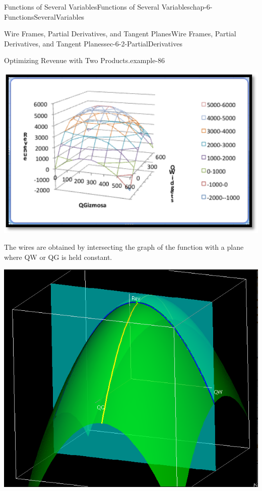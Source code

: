 \documentclass[oneside,10pt,]{book}
\numberwithin{equation}{section}
\begin{document}
\begin{chapterptx}{Functions of Several Variables}{}{Functions of Several Variables}{}{}{chap-6-FunctionsSeveralVariables}
\begin{sectionptx}{Wire Frames, Partial Derivatives, and Tangent Planes}{}{Wire Frames, Partial Derivatives, and Tangent Planes}{}{}{sec-6-2-PartialDerivatives}
\begin{example}{Optimizing Revenue with Two Products.}{example-86}
\begin{sidebyside}{1}{0.2}{0.2}{0}%
\begin{sbspanel}{0.6}%
\includegraphics[width=1\linewidth]{images/sec-6-2-2.png}
\end{sbspanel}%
\end{sidebyside}%
\par
\hypertarget{p-2209}{}%
The wires are obtained by intersecting the graph of the function with a plane where QW or QG is held constant.%
\begin{sidebyside}{1}{0.25}{0.25}{0}%
\begin{sbspanel}{0.5}%
\includegraphics[width=1\linewidth]{images/sec-6-2-3.png}
\end{sbspanel}%
\end{sidebyside}%

\end{example}
\end{sectionptx}
\end{chapterptx}
\end{document}
